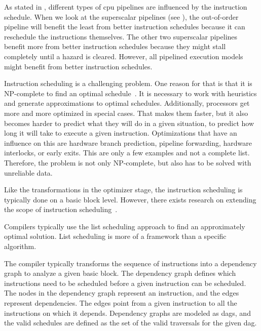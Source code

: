 As stated in , different types of \ac{cpu} pipelines are influenced by the instruction schedule.
When we look at the superscalar pipelines (see ), the out-of-order pipeline will benefit the least from better instruction schedules because it can reschedule the instructions themselves.
The other two superscalar pipelines benefit more from better instruction schedules because they might stall completely until a hazard is cleared.
However, all pipelined execution models might benefit from better instruction schedules.

Instruction scheduling is a challenging problem.
One reason for that is that it is NP-complete to find an optimal schedule~\cite{hennessy1983postpass}.
It is necessary to work with heuristics and generate approximations to optimal schedules.
Additionally, processors get more and more optimized in special cases.
That makes them faster, but it also becomes harder to predict what they will do in a given situation, \ie to predict how long it will take to execute a given instruction.
Optimizations that have an influence on this are hardware branch prediction, pipeline forwarding, hardware interlocks, or early exits.
This are only a few examples and not a complete list.
Therefore, the problem is not only NP-complete, but also has to be solved with unreliable data.

Like the transformations in the optimizer stage, the instruction scheduling is typically done on a basic block level.
However, there exists research on extending the scope of instruction scheduling~\cite{fisher1981trace,bernstein1991global,hwu1993superblock}.

Compilers typically use the list scheduling approach to find an approximately optimal solution.
List scheduling is more of a framework than a specific algorithm.

The compiler typically transforms the sequence of instructions into a dependency graph to analyze a given basic block.
The dependency graph defines which instructions need to be scheduled before a given instruction can be scheduled.
The nodes in the dependency graph represent an instruction, and the edges represent dependencies.
The edges point from a given instruction to all the instructions on which it depends.
Dependency graphs are modeled as \acp{dag}, and the valid schedules are defined as the set of the valid traversals for the given \ac{dag}.

